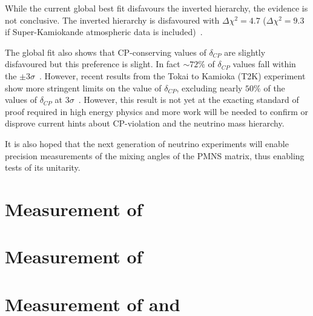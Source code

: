 While the current global best fit disfavours the inverted hierarchy, the evidence is not conclusive.
The inverted hierarchy is disfavoured with $\Delta \chi^{2}=4.7$ ($\Delta \chi^{2}=9.3$ if Super-Kamiokande atmospheric data is included)~\cite{nufit4}.

The global fit also shows that CP-conserving values of $\delta_{CP}$ are slightly disfavoured but this preference is slight.
In fact $\sim72\%$ of $\delta_{CP}$ values fall within the $\pm3\sigma$~\cite{nufit4}.
However, recent results from the Tokai to Kamioka (T2K) experiment show more stringent limits on the value of $\delta_{CP}$, excluding nearly $50\%$ of the values of $\delta_{CP}$ at $3\sigma$~\cite{t2kRecent}.
However, this result is not yet at the exacting standard of proof required in high energy physics and more work will be needed to confirm or disprove current hints about CP-violation and the neutrino mass hierarchy.

It is also hoped that the next generation of neutrino experiments will enable precision measurements of the mixing angles of the PMNS matrix, thus enabling tests of its unitarity.


\section{Measurement of }
\label{sec:theory:currentState:theta13}

\section{Measurement of }
\label{sec:theory:currentState:theta23}

\section{Measurement of  and }
\label{sec:theory:currentState:solar}

